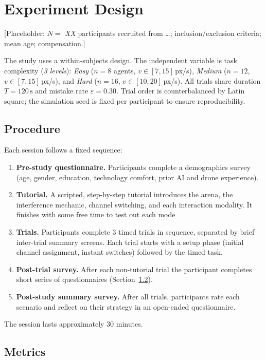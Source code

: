 \documentclass[10pt]{article}
\theoremstyle{definition}
\begin{document}
\section{Experiment Design}\label{sec:study}
[Placeholder: $N =$ \textit{XX} participants recruited from \ldots; inclusion/exclusion criteria; mean age; compensation.]

The study uses a within-subjects design. The independent variable is task complexity (\textit{3 levels}): \textit{Easy} ($n=8$ agents, $v \in [7, 15]$\,px/s), \textit{Medium} ($n=12$, $v \in [7, 15]$\,px/s), and \textit{Hard} ($n=16$, $v \in [10, 20]$\,px/s). All trials share duration $T = 120\,\mathrm{s}$ and mistake rate $\varepsilon = 0.30$. Trial order is counterbalanced by Latin square; the simulation seed is fixed per participant to ensure reproducibility.

\subsection{Procedure}

Each session follows a fixed sequence:
\begin{enumerate}[noitemsep]
  \item \textbf{Pre-study questionnaire.} Participants complete a demographics survey (age, gender, education, technology comfort, prior AI and drone experience).
  \item \textbf{Tutorial.} A scripted, step-by-step tutorial introduces the arena, the interference mechanic, channel switching, and each interaction modality. It finishes with some free time to test out each mode
  \item \textbf{Trials.} Participants complete 3 timed trials in sequence, separated by brief inter-trial summary screens. Each trial starts with a setup phase (initial channel assignment, instant switches) followed by the timed task.
  \item \textbf{Post-trial survey.} After each non-tutorial trial the participant completes short series of questionnaires (Section~\ref{sec:metrics}).
  \item \textbf{Post-study summary survey.} After all trials, participants rate each scenario and reflect on their strategy in an open-ended questionnaire.
\end{enumerate}

The session lasts approximately 30 minutes.

\subsection{Metrics}\label{sec:metrics}
\end{document}
